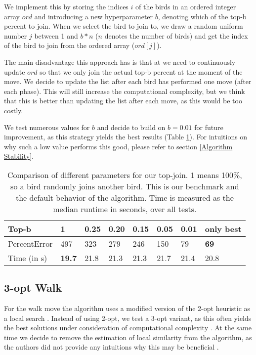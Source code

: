 We implement this by storing the indices $i$ of the birds in an ordered integer array $ord$ and introducing a new hyperparameter $b$, denoting which of the top-b percent to join. When we select the bird to join to, we draw a random uniform number $j$ between 1 and $b*n$ ($n$ denotes the number of birds) and get the index of the bird to join from the ordered array ($ord[j]$).

The main disadvantage this approach has is that at we need to continuously update $ord$ so that we only join the actual top-b percent at the moment of the move.
We decide to update the list after each bird has performed one move (after each phase).
This will still increase the computational complexity, but we think that this is better than updating the list after each move, as this would be too costly.

We test numerous values for $b$ and decide to build on $b=0.01$ for future improvement, as this strategy yields the best results (Table \ref{top_b_performance}). For intuitions on why such a low value performs this good, please refer to section \ref{Algorithm Stability}.

\begin{table}[h!]
\centering
\begin{tabular}{ |p{1.5cm}||p{0.75cm}|p{0.75cm}|p{0.75cm}|p{0.75cm}|p{0.75cm}|p{0.75cm}|p{0.75cm}|  }
 \hline
 Top-b& 1 & 0.25 & 0.20 & 0.15 & 0.05 & 0.01&\textbf{only best}\\
\hline \hline
 PercentError & 497 &323 & 279 &  246 & 150 & 79 &\textbf{69}\\
 \hline
 Time (in s) & \textbf{19.7} & 21.8 & 21.3 &  21.3 & 21.7 & 21.4 & 20.8\\
 \hline
\end{tabular}
\caption{Comparison of different parameters for our top-join. 1 means 100\%, so a bird randomly joins another bird. This is our benchmark and the
default behavior of the algorithm. Time is measured as the median runtime in seconds, over all tests.}
\label{top_b_performance}
\end{table}

\subsection{3-opt Walk}

For the walk move the algorithm uses a modified version of the 2-opt heuristic as a local search \cite{afb}. Instead of using 2-opt, we test a 3-opt variant, as this often yields the best solutions under consideration of computational complexity \cite{lin}. At the same time we decide to remove the estimation of local similarity from the algorithm, as the authors did not provide any intuitions why this may be beneficial \cite{afb}.

